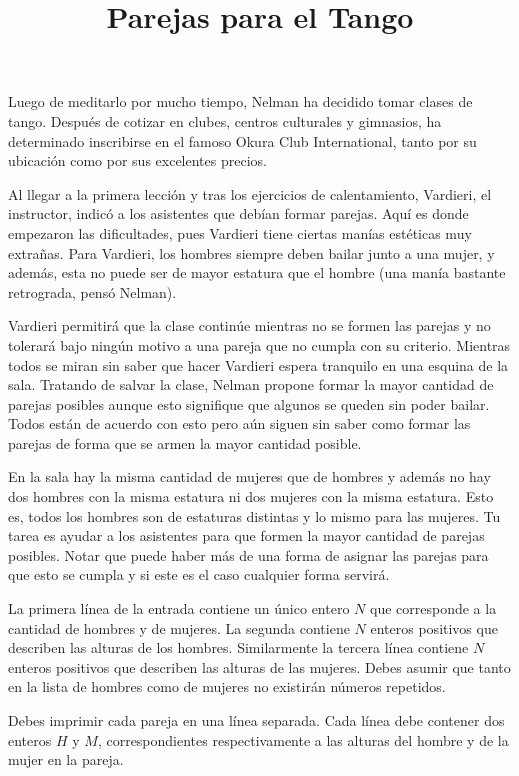 \documentclass{oci}
\title{Parejas para el Tango}
\begin{document}
\begin{problemDescription}
Luego de meditarlo por mucho tiempo, Nelman ha decidido tomar clases de tango.
Después de cotizar en clubes, centros culturales y gimnasios, ha determinado inscribirse en el famoso Okura Club International, tanto por su ubicación como por sus excelentes precios.

Al llegar a la primera lección y tras los ejercicios de calentamiento, Vardieri, el instructor, indicó a los asistentes que debían formar parejas.
Aquí es donde empezaron las dificultades, pues Vardieri tiene ciertas manías estéticas muy extrañas.
Para Vardieri, los hombres siempre deben bailar junto a una mujer, y además, esta no puede ser de mayor estatura que el hombre (una manía bastante retrograda, pensó Nelman).

Vardieri permitirá que la clase continúe mientras no se formen las parejas y no tolerará bajo ningún motivo a una pareja que no cumpla con su criterio.
Mientras todos se miran sin saber que hacer Vardieri espera tranquilo en una esquina de la sala.
Tratando de salvar la clase, Nelman propone formar la mayor cantidad de parejas posibles aunque esto signifique que algunos se queden sin poder bailar.
Todos están de acuerdo con esto pero aún siguen sin saber como formar las parejas de forma que se armen la mayor cantidad posible.

En la sala hay la misma cantidad de mujeres que de hombres y además no hay dos hombres con la misma estatura ni dos mujeres con la misma estatura.
Esto es, todos los hombres son de estaturas distintas y lo mismo para las mujeres.
Tu tarea es ayudar a los asistentes para que formen la mayor cantidad de parejas posibles.
Notar que puede haber más de una forma de asignar las parejas para que esto se cumpla y si este es el caso cualquier forma servirá.

\end{problemDescription}

\begin{inputDescription}
La primera línea de la entrada contiene un único entero $N$ que corresponde a la cantidad de hombres y de mujeres.
La segunda contiene $N$ enteros positivos que describen las alturas de los hombres.
Similarmente la tercera línea contiene $N$ enteros positivos que describen las alturas de las mujeres.
Debes asumir que tanto en la lista de hombres como de mujeres no existirán números repetidos.
\end{inputDescription}

\begin{outputDescription}
Debes imprimir cada pareja en una línea separada.
Cada línea debe contener dos enteros $H$ y $M$, correspondientes respectivamente a las alturas del hombre y de la mujer en la pareja.
\end{outputDescription}
\end{document}

